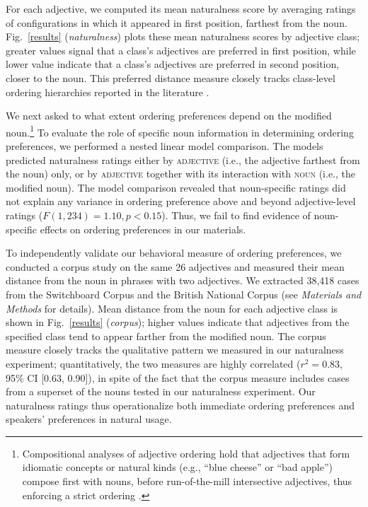 \documentclass{pnastwo}
\begin{document}
\begin{article}
For each adjective, we computed its mean naturalness score by averaging ratings of configurations in which it appeared in first position, farthest from the noun. Fig.\ \ref{results} (\emph{naturalness}) plots these mean naturalness scores by adjective class; greater values signal that a class's adjectives are preferred in first position, while lower value indicate that a class's adjectives are preferred in second position, closer to the noun. This preferred distance measure closely tracks class-level ordering hierarchies reported in the literature \cite{dixon1982,sproatshih1991}.

We next asked to what extent ordering preferences depend on the modified noun.\footnote{Compositional analyses of adjective ordering hold that adjectives that form idiomatic concepts or natural kinds (e.g., ``blue cheese'' or ``bad apple'') compose first with nouns, before run-of-the-mill intersective adjectives, thus enforcing a strict ordering \cite{mcnallyboleda2004,svenonius2008}.} 
To evaluate the role of specific noun information in determining ordering preferences, we performed a nested linear model comparison. The models predicted naturalness ratings either by \textsc{adjective} (i.e., the adjective farthest from the noun) only, or by \textsc{adjective} together with its interaction with \textsc{noun} (i.e., the modified noun).
The model comparison revealed that noun-specific ratings did not explain any variance in ordering preference above and beyond adjective-level ratings ($F(1,234) = 1.10, p < 0.15$).  Thus, we fail to find evidence of noun-specific effects on ordering preferences in our materials.

To independently validate our behavioral measure of ordering preferences, we conducted a corpus study on the same 26 adjectives and measured their mean distance from the noun in phrases with two adjectives. We extracted 38,418 cases from the Switchboard Corpus and the British National Corpus (see \emph{Materials and Methods} for details). Mean distance from the noun for each adjective class is shown in Fig.~\ref{results} (\emph{corpus}); higher values indicate that adjectives from the specified class tend to appear farther from the modified noun. The corpus measure closely tracks the qualitative pattern we measured in our naturalness experiment; quantitatively, the two measures are highly correlated ($r^{2}=0.83$, 95\% CI [0.63, 0.90]), in spite of the fact that the corpus measure includes cases from a superset of the nouns tested in our naturalness experiment. Our naturalness ratings thus operationalize both immediate ordering preferences and speakers' preferences in natural usage.



\end{article}
\end{document}
